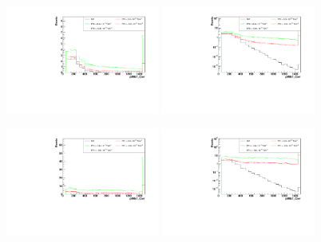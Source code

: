 \begin{figure}[h]
  \begin{center}
	\includegraphics[width=0.45\textwidth]{Plots/aQGC_kinematics/pfMET_Corr_FT0.pdf}%
	\includegraphics[width=0.45\textwidth]{Plots/aQGC_kinematics/pfMET_Corr_FT0_log.pdf}\\				
    \caption{}
  \end{center}
\end{figure}
\begin{figure}[h]
  \begin{center}
	\includegraphics[width=0.45\textwidth]{Plots/aQGC_kinematics/pfMET_Corr_FT1.pdf}%
	\includegraphics[width=0.45\textwidth]{Plots/aQGC_kinematics/pfMET_Corr_FT1_log.pdf}\\				
    \caption{}
  \end{center}
\end{figure}

